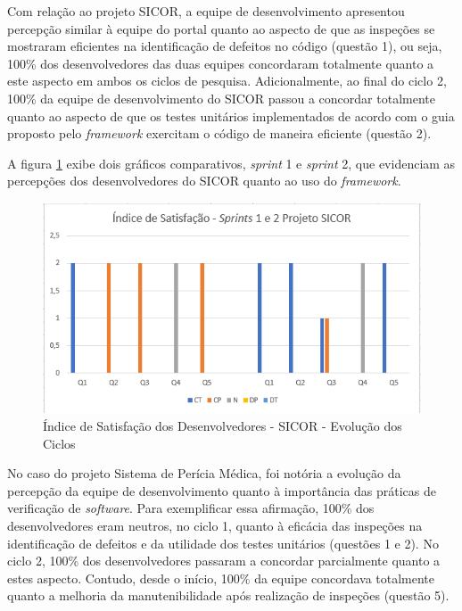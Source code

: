 \hfill \break

\hfill \break

\hfill \break

\hfill \break

\hfill \break

\hfill \break

Com relação ao projeto SICOR, a equipe de desenvolvimento apresentou percepção similar à equipe do portal quanto ao aspecto de que as inspeções se mostraram eficientes na identificação de defeitos no código (questão 1), ou seja, 100\% dos desenvolvedores das duas equipes concordaram totalmente quanto a este aspecto em ambos os ciclos de pesquisa. Adicionalmente, ao final do ciclo 2, 100\% da equipe de desenvolvimento do SICOR passou a concordar totalmente quanto ao aspecto de que os testes unitários implementados de acordo com o guia proposto pelo \textit{framework} exercitam o código de maneira eficiente (questão 2).

A figura \ref{fig:evolucaoSicor} exibe dois gráficos comparativos, \textit{sprint} 1 e \textit{sprint} 2, que evidenciam as percepções dos desenvolvedores do SICOR quanto ao uso do \textit{framework}.

\begin{figure}[h]
\includegraphics[width=\textwidth]{figuras/isd_sicor.png}
\caption{Índice de Satisfação dos Desenvolvedores - SICOR - Evolução dos Ciclos}
\label{fig:evolucaoSicor}
\end{figure}

\hfill \break

\hfill \break

\hfill \break

\hfill \break

\hfill \break

No caso do projeto Sistema de Perícia Médica, foi notória a evolução da percepção da equipe de desenvolvimento quanto à importância das práticas de verificação de \textit{software}. Para exemplificar essa afirmação, 100\% dos desenvolvedores eram neutros, no ciclo 1, quanto à eficácia das inspeções na identificação de defeitos e da utilidade dos testes unitários (questões 1 e 2). No ciclo 2, 100\% dos desenvolvedores passaram a concordar parcialmente quanto a estes aspecto. Contudo, desde o início, 100\% da equipe concordava totalmente quanto a melhoria da manutenibilidade após realização de inspeções (questão 5).

